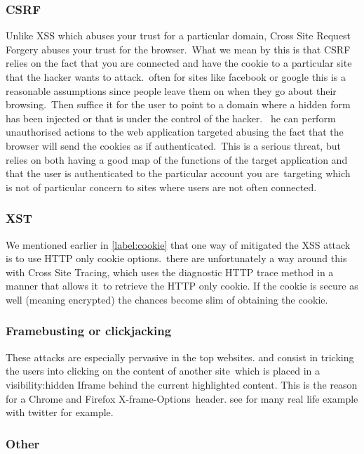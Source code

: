\documentclass[a4paper,12pt]{paper}
\begin{document}
\subsubsection{CSRF}

Unlike XSS which abuses your trust for a particular domain, Cross Site Request Forgery abuses your trust for the browser.\
What we mean by this is that CSRF relies on the fact that you are connected and have the cookie to a particular site that the hacker wants to attack.\
often for sites like facebook or google this is a reasonable assumptions since people leave them on when they go about their browsing.\ Then suffice it for the user
to point to a domain where a hidden form has been injected or that is under the control of the hacker. \
he can perform unauthorised actions to the web application targeted abusing the fact that the browser will send the cookies as if authenticated.\
This is a serious threat, but relies on both having a good map of the functions of the target application and that the user is authenticated to the particular account you are\
targeting which is not of particular concern to sites where users are not often connected.

\subsubsection{XST}

We mentioned earlier in \ref{label:cookie} that one way of mitigated the XSS attack is to use HTTP only cookie options.\
there are unfortunately a way around this with Cross Site Tracing, which uses the diagnostic HTTP trace method in a manner that allows it\
to retrieve the HTTP only cookie. If the cookie is secure as well (meaning encrypted) the chances become slim of obtaining the cookie.\


\subsubsection{Framebusting or clickjacking}

These attacks are especially pervasive in the top websites. and consist in tricking the users into clicking on the content of another site\
which is placed in a visibility:hidden Iframe behind the current highlighted content. This is the reason for a Chrome and Firefox X-frame-Options\
header. see \cite{buster} for many real life example with twitter for example.

\subsubsection{Other}
\end{document}
